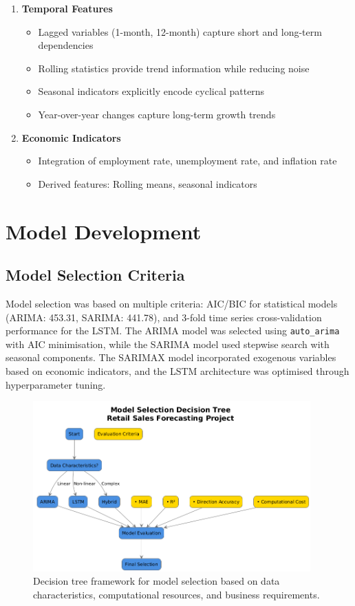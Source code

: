 \documentclass[12pt,a4paper]{report}
\begin{document}
\begin{enumerate}
    \item \textbf{Temporal Features}
    \begin{itemize}
        \item Lagged variables (1-month, 12-month) capture short and long-term dependencies
        \item Rolling statistics provide trend information while reducing noise
        \item Seasonal indicators explicitly encode cyclical patterns
        \item Year-over-year changes capture long-term growth trends
    \end{itemize}

    \item \textbf{Economic Indicators}
    \begin{itemize}
        \item Integration of employment rate, unemployment rate, and inflation rate
        \item Derived features: Rolling means, seasonal indicators
    \end{itemize}
\end{enumerate}

\section{Model Development}
\subsection{Model Selection Criteria}
\sloppy
Model selection was based on multiple criteria: AIC/BIC for statistical models 
(ARIMA: 453.31, SARIMA: 441.78), and 3-fold time series cross-validation 
performance for the LSTM. The ARIMA model was selected using \texttt{auto\_arima} 
with AIC minimisation, while the SARIMA model used stepwise search with seasonal 
components. The SARIMAX model incorporated exogenous variables based on economic 
indicators, and the LSTM architecture was optimised through hyperparameter tuning.
\fussy

\begin{figure}[htbp]
    \centering
    \includegraphics[width=0.95\textwidth]{model_selection_decision_tree.png}
    \caption{Decision tree framework for model selection based on data characteristics, computational resources, and business requirements.}
    \label{fig:model_selection_tree}
\end{figure}
\end{document}
